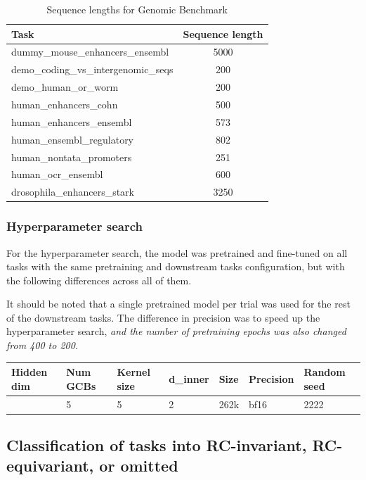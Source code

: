 \documentclass[   ]{article}
\begin{document}
\begin{table}[htbp]
	\centering
	\caption{Sequence lengths for Genomic Benchmark}
	\begin{tabular}{lc}
		\toprule
		Task & Sequence length \\
		\midrule
		dummy\_mouse\_enhancers\_ensembl & 5000 \\
		demo\_coding\_vs\_intergenomic\_seqs & 200 \\
		demo\_human\_or\_worm & 200 \\
		human\_enhancers\_cohn & 500 \\
		human\_enhancers\_ensembl & 573 \\
		human\_ensembl\_regulatory & 802 \\
		human\_nontata\_promoters & 251 \\
		human\_ocr\_ensembl & 600 \\
		drosophila\_enhancers\_stark & 3250 \\
		\bottomrule
	\end{tabular}
\end{table}

\subsubsection{Hyperparameter search}\label{hyperparameter-search}

For the hyperparameter search, the model was pretrained and fine-tuned
on all tasks with the same pretraining and downstream tasks
configuration, but with the following differences across all of them.

It should be noted that a single pretrained model per trial was used for
the rest of the downstream tasks. The difference in precision was to speed up the hyperparameter search, \emph{and the number of pretraining epochs was also changed from 400 to 200.}

{\def\LTcaptype{none} %
	\begin{longtable}[]{@{}lllllll@{}}
		\toprule\noalign{}
		Hidden dim & Num GCBs & Kernel size & d\_inner & Size & Precision & Random seed \\
		\midrule\noalign{}
		\endhead
		\bottomrule\noalign{}
		\endlastfoot
		64 & 5 & 5 & 2 & 262k & bf16 & 2222 \\
	\end{longtable}
}

\subsection{Classification of tasks into RC-invariant, RC-equivariant, or omitted}
\label{sec:downstream-task-canon-classification}
\end{document}
